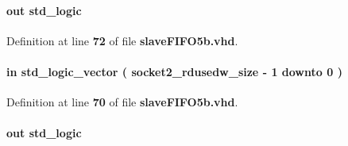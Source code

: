 \paragraph[{socket2\+\_\+fifo\+\_\+rd}]{ {\bfseries \textcolor{keywordflow}{out}\textcolor{vhdlchar}{ }} {\bfseries \textcolor{comment}{std\+\_\+logic}\textcolor{vhdlchar}{ }} \hspace{0.3cm}{\ttfamily [Port]}}\label{classslaveFIFO5b_aec50d09d38e9bcc6b5aa150046230132}


Definition at line {\bf 72} of file {\bf slave\+F\+I\+F\+O5b.\+vhd}.

\paragraph[{socket2\+\_\+fifo\+\_\+rdusedw}]{ {\bfseries \textcolor{keywordflow}{in}\textcolor{vhdlchar}{ }} {\bfseries \textcolor{comment}{std\+\_\+logic\+\_\+vector}\textcolor{vhdlchar}{ }\textcolor{vhdlchar}{(}\textcolor{vhdlchar}{ }\textcolor{vhdlchar}{ }\textcolor{vhdlchar}{ }\textcolor{vhdlchar}{ }{\bfseries {\bf socket2\+\_\+rdusedw\+\_\+size}} \textcolor{vhdlchar}{-\/}\textcolor{vhdlchar}{ } \textcolor{vhdldigit}{1} \textcolor{vhdlchar}{ }\textcolor{keywordflow}{downto}\textcolor{vhdlchar}{ }\textcolor{vhdlchar}{ } \textcolor{vhdldigit}{0} \textcolor{vhdlchar}{ }\textcolor{vhdlchar}{)}\textcolor{vhdlchar}{ }} \hspace{0.3cm}{\ttfamily [Port]}}\label{classslaveFIFO5b_a645c6b8dc18c4c7940179edebcb7b89e}


Definition at line {\bf 70} of file {\bf slave\+F\+I\+F\+O5b.\+vhd}.

\paragraph[{socket2\+\_\+fifo\+\_\+wr}]{ {\bfseries \textcolor{keywordflow}{out}\textcolor{vhdlchar}{ }} {\bfseries \textcolor{comment}{std\+\_\+logic}\textcolor{vhdlchar}{ }} \hspace{0.3cm}{\ttfamily [Port]}}\label{classslaveFIFO5b_a0905e1aab36b8c8597d38820b0e0780d}


